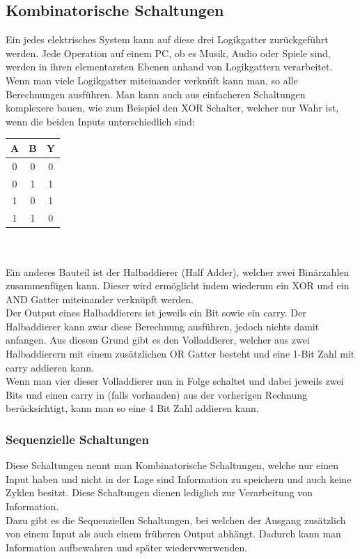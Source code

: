 \documentclass{article}
\begin{document}
		\subsection{Kombinatorische Schaltungen}
		Ein jedes elektrisches System kann auf diese drei Logikgatter zurückgeführt werden. Jede Operation auf einem PC, ob es Musik, Audio oder Spiele sind, werden in ihren elementarsten Ebenen anhand von Logikgattern verarbeitet. \\
		Wenn man viele Logikgatter miteinander verknüft kann man, so alle Berechnungen ausführen. Man kann auch aus einfacheren Schaltungen komplexere bauen, wie zum Beispiel den XOR Schalter, welcher nur Wahr ist, wenn die beiden Inputs unterschiedlich sind:
		\begin{tabular}{| c | c | c |}
			\toprule
			A & B & Y \\ \midrule
			0 & 0 & 0 \\ \hline
			0 & 1 & 1 \\ \hline
			1 & 0 & 1 \\ \hline
			1 & 1 & 0 \\
			\bottomrule
		\end{tabular} \\ \\
		Ein anderes Bauteil ist der Halbaddierer (Half Adder), welcher zwei Binärzahlen zusammenfügen kann. Dieser wird ermöglicht indem wiederum ein XOR und ein AND Gatter miteinander verknüpft werden. \\
		Der Output eines Halbaddierers ist jeweils ein Bit sowie ein carry. Der Halbaddierer kann zwar diese Berechnung ausführen, jedoch nichts damit anfangen. Aus diesem Grund gibt es den Volladdierer, welcher aus zwei Halbaddierern mit einem zusätzlichen OR Gatter besteht und eine 1-Bit Zahl mit carry addieren kann. \\
		Wenn man vier dieser Volladdierer nun in Folge schaltet und dabei jeweils zwei Bits und einen carry in (falls vorhanden) aus der vorherigen Rechnung berücksichtigt, kann man so eine 4 Bit Zahl addieren kann. 
		\subsubsection{Sequenzielle Schaltungen}
		Diese Schaltungen nennt man Kombinatorische Schaltungen, welche nur einen Input haben und nicht in der Lage sind Information zu speichern und auch keine Zyklen besitzt. Diese Schaltungen dienen lediglich zur Verarbeitung von Information. \\
		Dazu gibt es die Sequenziellen Schaltungen, bei welchen der Ausgang zusätzlich von einem Input als auch einem früheren Output abhängt. Dadurch kann man Information aufbewahren und später wiedervwerwenden.
		\newpage
\end{document}

